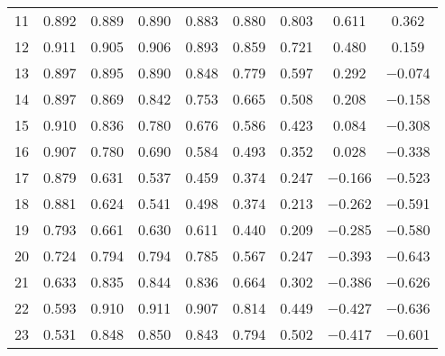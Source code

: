 \begin{table}[htpb]
\begin{tabular}{ccccccccc}
        \num{11} & \num{0.892} & \num{0.889} & \num{0.890} & \num{0.883} & \num{0.880} & \num{0.803} & \num{0.611} & \num{0.362} \\
        \num{12} & \num{0.911} & \num{0.905} & \num{0.906} & \num{0.893} & \num{0.859} & \num{0.721} & \num{0.480} & \num{0.159} \\
        \num{13} & \num{0.897} & \num{0.895} & \num{0.890} & \num{0.848} & \num{0.779} & \num{0.597} & \num{0.292} & \num{-0.074} \\
        \num{14} & \num{0.897} & \num{0.869} & \num{0.842} & \num{0.753} & \num{0.665} & \num{0.508} & \num{0.208} & \num{-0.158} \\
        \num{15} & \num{0.910} & \num{0.836} & \num{0.780} & \num{0.676} & \num{0.586} & \num{0.423} & \num{0.084} & \num{-0.308} \\
        \num{16} & \num{0.907} & \num{0.780} & \num{0.690} & \num{0.584} & \num{0.493} & \num{0.352} & \num{0.028} & \num{-0.338} \\
        \num{17} & \num{0.879} & \num{0.631} & \num{0.537} & \num{0.459} & \num{0.374} & \num{0.247} & \num{-0.166} & \num{-0.523} \\
        \num{18} & \num{0.881} & \num{0.624} & \num{0.541} & \num{0.498} & \num{0.374} & \num{0.213} & \num{-0.262} & \num{-0.591} \\
        \num{19} & \num{0.793} & \num{0.661} & \num{0.630} & \num{0.611} & \num{0.440} & \num{0.209} & \num{-0.285} & \num{-0.580} \\
        \num{20} & \num{0.724} & \num{0.794} & \num{0.794} & \num{0.785} & \num{0.567} & \num{0.247} & \num{-0.393} & \num{-0.643} \\
        \num{21} & \num{0.633} & \num{0.835} & \num{0.844} & \num{0.836} & \num{0.664} & \num{0.302} & \num{-0.386} & \num{-0.626} \\
        \num{22} & \num{0.593} & \num{0.910} & \num{0.911} & \num{0.907} & \num{0.814} & \num{0.449} & \num{-0.427} & \num{-0.636} \\
        \num{23} & \num{0.531} & \num{0.848} & \num{0.850} & \num{0.843} & \num{0.794} & \num{0.502} & \num{-0.417} & \num{-0.601} \\
        \bottomrule
    \end{tabular}
\end{table}

